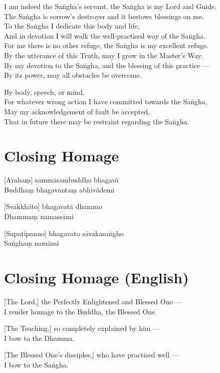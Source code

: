 I am indeed the Saṅgha's servant, the Saṅgha is my Lord and Guide.\\
The Saṅgha is sorrow's destroyer and it bestows blessings on me.\\
To the Saṅgha I dedicate this body and life,\\
And in devotion I will walk the well-practised way of the Saṅgha.\\
For me there is no other refuge, the Saṅgha is my excellent refuge.\\
By the utterance of this Truth, may I grow in the Master's Way.\\
By my devotion to the Saṅgha, and the blessing of this practice ---\\
By its power, may all obstacles be overcome.


By body, speech, or mind,\\
For whatever wrong action I have committed towards the Saṅgha,\\
May my acknowledgement of fault be accepted,\\
That in future there may be restraint regarding the Saṅgha.

\section*{Closing Homage}

[Arahaṃ] sammāsambuddho bhagavā\\
Buddhaṃ bhagavantaṃ abhivādemi

[Svākkhāto] bhagavatā dhammo\\
Dhammaṃ namassāmi

[Supaṭipanno] bhagavato sāvakasaṅgho\\
Saṅghaṃ namāmi

\section*{Closing Homage (English)}

[The Lord,] the Perfectly Enlightened and Blessed One ---\\
I render homage to the Buddha, the Blessed One. 

[The Teaching,] so completely explained by him ---\\
I bow to the Dhamma. 

[The Blessed One's disciples,] who have practised well ---\\
I bow to the Saṅgha. 


